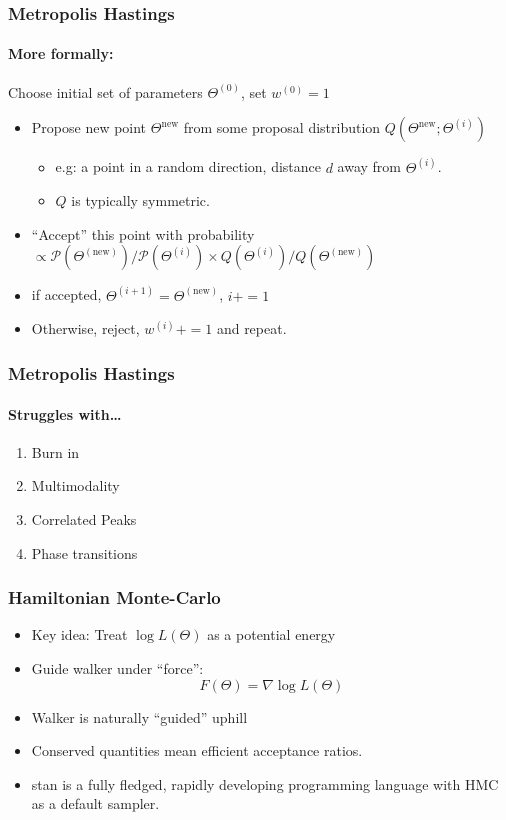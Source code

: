 \documentclass[%
]{beamer}
\begin{document}
\begin{frame}
  \frametitle{Metropolis Hastings} 
  \framesubtitle{More formally:}
  \begin{description}
      \item<1->[Step 0]{Choose initial set of parameters $\Theta^{(0)}$, set $w^{(0)}=1$}
      \item<2->[Step i]
          \begin{itemize}
              \item<3-> Propose new point $\Theta^{\mathrm{new}}$ from some proposal distribution $Q(\Theta^{\mathrm{new}};\Theta^{(i)})$
                  \begin{itemize}
                      \item<4-> e.g:\: a point in a random direction, distance $d$ away from $\Theta^{(i)}$.
                      \item<5-> $Q$ is typically symmetric.
                  \end{itemize}
              \item<6-> ``Accept'' this point with probability $\propto \mathcal{P}(\Theta^{(\mathrm{new})})/\mathcal{P}(\Theta^{(i)}) \times Q(\Theta^{(i)}) / Q(\Theta^{(\mathrm{new})}) $
              \item<7-> if accepted, $\Theta^{(i+1)} = \Theta^{(\mathrm{new})}$, $i+=1$
              \item<8-> Otherwise, reject, $w^{(i)}+=1$ and repeat.
          \end{itemize}
  \end{description}
\end{frame}

\begin{frame}
\end{frame}


\begin{frame}
  \frametitle{Metropolis Hastings} 
  \framesubtitle{Struggles with\ldots}
  \begin{enumerate}
      \pause\item Burn in
      \pause\item Multimodality
      \pause\item Correlated Peaks
      \pause\item Phase transitions
  \end{enumerate}
\end{frame}

\begin{frame}
  \frametitle{Hamiltonian Monte-Carlo} 
  \begin{itemize}
      \pause\item Key idea: Treat $\log L(\Theta)$ as a potential energy
      \pause\item Guide walker under ``force'': \[F(\Theta) =\nabla \log L(\Theta)\]
      \pause\item Walker is naturally ``guided'' uphill
      \pause\item Conserved quantities mean efficient acceptance ratios.
      \pause\item stan is a fully fledged, rapidly developing programming language with HMC as a default sampler.
  \end{itemize}
\end{frame}
\end{document}
